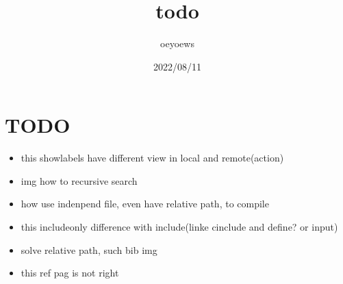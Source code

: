 \documentclass[UTF8]{article}
\title{todo \emoji{check-mark-button}}
\author{oeyoews}
\date{2022/08/11}
\begin{document}

\maketitle

\section{TODO }%
\label{sec:TODO}

\begin{itemize}
  \item this showlabels have different view in local and remote(action)
  \item img how to recursive search
  \item how use indenpend file, even have relative path, to compile
  \item this includeonly difference with include(linke cinclude and define? or
    input)
  \item solve relative path, such bib img
  \item this ref pag is not right
\end{itemize}
\end{document}
